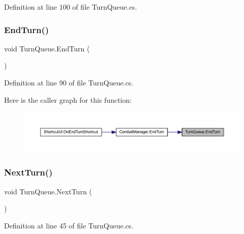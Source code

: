 Definition at line 100 of file Turn\+Queue.\+cs.

\mbox{\label{class_turn_queue_aadfdf0f72201cdc985ad2dbb9520eaee}} 
\subsubsection{\texorpdfstring{EndTurn()}{EndTurn()}}
{\footnotesize\ttfamily void Turn\+Queue.\+End\+Turn (\begin{DoxyParamCaption}{ }\end{DoxyParamCaption})}



Definition at line 90 of file Turn\+Queue.\+cs.

Here is the caller graph for this function\+:
\nopagebreak
\begin{figure}[H]
\begin{center}
\leavevmode
\includegraphics[width=350pt]{class_turn_queue_aadfdf0f72201cdc985ad2dbb9520eaee_icgraph}
\end{center}
\end{figure}
\mbox{\label{class_turn_queue_acae6f91ff8006307a04d4ee9362c1b7e}} 
\subsubsection{\texorpdfstring{NextTurn()}{NextTurn()}}
{\footnotesize\ttfamily void Turn\+Queue.\+Next\+Turn (\begin{DoxyParamCaption}{ }\end{DoxyParamCaption})}



Definition at line 45 of file Turn\+Queue.\+cs.

